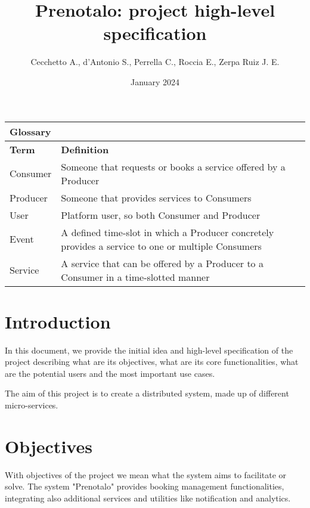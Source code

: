 \documentclass{article}
\title{Prenotalo: project high-level specification}
\author{Cecchetto A., d'Antonio S., Perrella C., Roccia E., Zerpa Ruiz J. E.}
\date{January 2024}
\begin{document}
\maketitle

\begin{table}[!h]
\centering
\begin{tabular}{l l}
\multicolumn{2}{l}{\textbf{Glossary}} \\
\hline
\textbf{Term} & \textbf{Definition} \\
\hline
Consumer & Someone that requests or books a service offered by a Producer \\
\hline
Producer & Someone that provides services to Consumers \\
\hline
User & Platform user, so both Consumer and Producer \\
\hline
Event & A defined time-slot in which a Producer concretely provides a service
	to one or multiple Consumers\\
\hline
Service & A service that can be offered by a Producer to a Consumer in a
	time-slotted manner\\ \hline
\end{tabular}

\end{table}


\section{Introduction}
In this document, we provide the initial idea and high-level specification of
the project describing what are its objectives, what are its core
functionalities, what are the potential users and the most important use cases.

The aim of this project is to create a distributed system, made up of different
micro-services. 

\section{Objectives}
With objectives of the project we mean what the system aims to facilitate or
solve. The system "Prenotalo" provides booking management functionalities,
integrating also additional services and utilities like notification and analytics.
\end{document}
